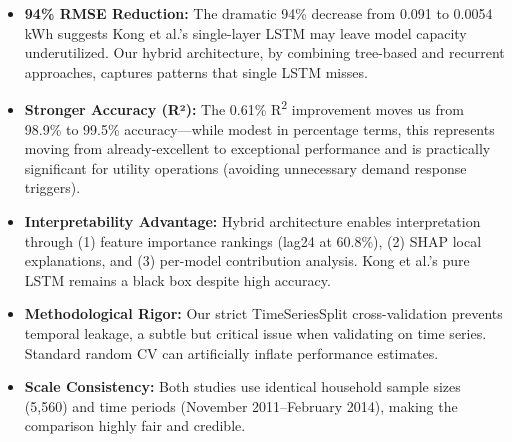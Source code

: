 \begin{itemize}
    \item \textbf{94\% RMSE Reduction:} The dramatic 94\% decrease from 0.091 to 0.0054 kWh suggests Kong et al.'s single-layer LSTM may leave model capacity underutilized. Our hybrid architecture, by combining tree-based and recurrent approaches, captures patterns that single LSTM misses.
    
    \item \textbf{Stronger Accuracy (R²):} The 0.61\% R\textsuperscript{2} improvement moves us from 98.9\% to 99.5\% accuracy—while modest in percentage terms, this represents moving from already-excellent to exceptional performance and is practically significant for utility operations (avoiding unnecessary demand response triggers).
    
    \item \textbf{Interpretability Advantage:} Hybrid architecture enables interpretation through (1) feature importance rankings (lag24 at 60.8\%), (2) SHAP local explanations, and (3) per-model contribution analysis. Kong et al.'s pure LSTM remains a black box despite high accuracy.
    
    \item \textbf{Methodological Rigor:} Our strict TimeSeriesSplit cross-validation prevents temporal leakage, a subtle but critical issue when validating on time series. Standard random CV can artificially inflate performance estimates.
    
    \item \textbf{Scale Consistency:} Both studies use identical household sample sizes (5,560) and time periods (November 2011--February 2014), making the comparison highly fair and credible.
\end{itemize}

